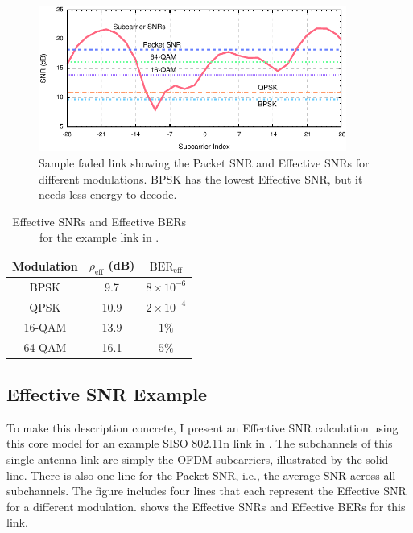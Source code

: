 \begin{figure}[t]
  \centering
  \includegraphics[width=0.9\textwidth]{figures/model/eff_snr_example.pdf}
  \caption[Packet SNR and Effective SNRs for a sample faded link]{Sample faded link showing the Packet SNR and Effective SNRs for different modulations. BPSK has the lowest Effective SNR, but it needs less energy to decode.}
  \label{fig:eff_example}
\end{figure}

\begin{table}[t]
	\centering
	\begin{tabular}{ccc}
	\toprule%
	Modulation & $\rho_\text{eff}$ (dB) & $\text{BER}_\text{eff}$\\
	\midrule%
	BPSK   &  9.7 & $8\times10^{-6}$\\
	QPSK   & 10.9 & $2\times10^{-4}$\\
	16-QAM & 13.9 & $1\%$\\
	64-QAM & 16.1 & $5\%$\\
	\bottomrule
	\end{tabular}
	\caption[Effective SNRs and Effective BERs for the example link in ]{\label{tab:example_bers}Effective SNRs and Effective BERs for the example link in .}
\end{table}

\subsection{Effective SNR Example}
To make this description concrete, I present an Effective SNR calculation using this core model for an example SISO 802.11n link in .  The subchannels of this single-antenna link are simply the OFDM subcarriers, illustrated by the solid line. There is also one line for the Packet SNR, i.e., the average SNR across all subchannels. The figure includes four lines that each represent the Effective SNR for a different modulation.  shows the Effective SNRs and Effective BERs for this link.

